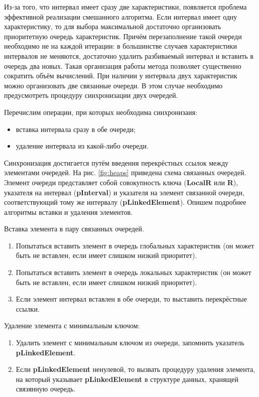 \par
Из-за того, что интервал имеет сразу две характеристики, появляется проблема эффективной реализации смешанного алгоритма. Если интервал имеет одну характеристику, то для выбора максимальной
достаточно организовать приоритетную очередь характеристик.
Причём перезаполнение такой очереди необходимо не на каждой итерации: в большинстве случаев характеристики интервалов не меняются, достаточно удалить разбиваемый интервал и вставить в очередь два новых.
Такая организация работы метода позволяет существенно сократить объём вычислений. При наличии у интервала двух характеристик можно организовать две связанные очереди. В этом случае необходимо предусмотреть
процедуру синхронизации двух очередей.
\par
Перечислим операции, при которых необходима синхронизаия:
\begin{itemize}
  \item вставка интервала сразу в обе очереди;
  \item удаление интервала из какой-либо очереди.
\end{itemize}
\par
Синхронизация достигается путём введения перекрёстных ссылок между элементами очередей. На рис. \ref{fig:heaps} приведена схема связанных очередей. Элемент очереди представляет собой
совокупность ключа (\textbf{LocalR} или \textbf{R}), указателя на интервал (\textbf{pInterval}) и указателя на элемент связанной очереди, соответствующий тому же интервалу (\textbf{pLinkedElement}).
Опишем подробнее алгоритмы вставки и удаления элементов.
\par
Вставка элемента в пару связанных очередей.
\begin{enumerate}
  \item Попытаться вставить элемент в очередь глобальных характеристик (он может быть не вставлен, если имеет слишком низкий приоритет).
  \item Попытаться вставить элемент в очередь локальных характеристик (он может быть не вставлен, если имеет слишком низкий приоритет).
  \item Если элемент интервал вставлен в обе очереди, то выставить перекрёстные ссылки.
\end{enumerate}
\par
Удаление элемента с минимальным ключом:
\begin{enumerate}
  \item Удалить элемент с минимальным ключом из очереди, запомнить указатель \textbf{pLinkedElement}.
  \item Если \textbf{pLinkedElement} ненулевой, то вызвать процедуру удаления элемента, на который указывает \textbf{pLinkedElement} в структуре данных, хранящей связянную очередь.
\end{enumerate}
